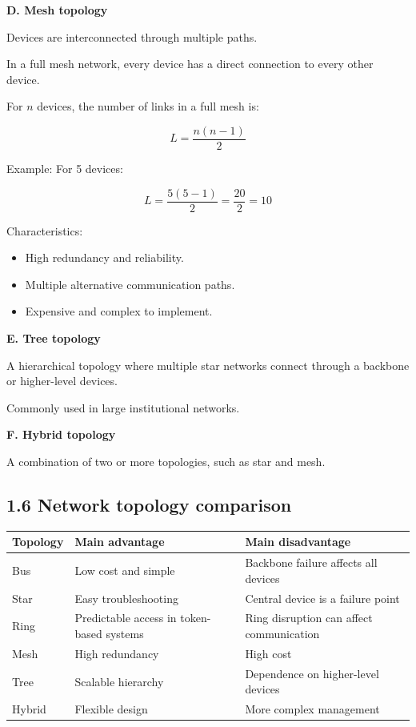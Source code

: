 \textbf{D. Mesh topology}

Devices are interconnected through multiple paths.

In a full mesh network, every device has a direct connection to every other device.

For $n$ devices, the number of links in a full mesh is:


\[
\boxed{L=\frac{n(n-1)}{2}}
\]


Example: For 5 devices:


\[
L=\frac{5(5-1)}{2}=\frac{20}{2}=10
\]


Characteristics:

\begin{itemize}
    \item High redundancy and reliability.
    \item Multiple alternative communication paths.
    \item Expensive and complex to implement.
\end{itemize}

\textbf{E. Tree topology}

A hierarchical topology where multiple star networks connect through a backbone or higher-level devices.

Commonly used in large institutional networks.

\textbf{F. Hybrid topology}

A combination of two or more topologies, such as star and mesh.

\subsection{1.6 Network topology comparison}

\begin{table}[htbp]
\centering
\begin{tabularx}{\textwidth}{p{2.6cm} X X}
\toprule
\textbf{Topology} & \textbf{Main advantage} & \textbf{Main disadvantage} \\
\midrule
Bus & Low cost and simple & Backbone failure affects all devices \\
Star & Easy troubleshooting & Central device is a failure point \\
Ring & Predictable access in token-based systems & Ring disruption can affect communication \\
Mesh & High redundancy & High cost \\
Tree & Scalable hierarchy & Dependence on higher-level devices \\
Hybrid & Flexible design & More complex management \\
\bottomrule
\end{tabularx}
\end{table}

